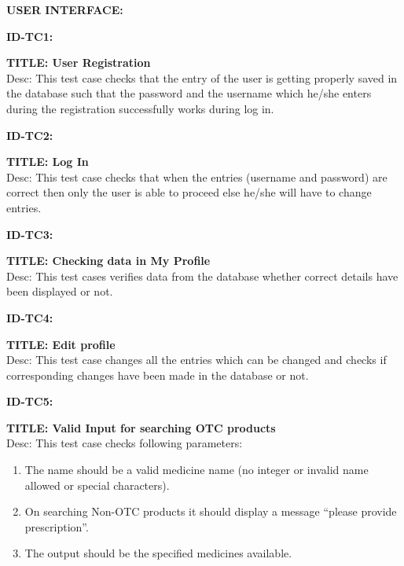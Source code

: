 \documentclass{article}
\begin{document}
\item \textbf{USER INTERFACE:}

\item \textbf{ID-TC1:}
\item \textbf{TITLE: User Registration}\\
Desc: This test case checks that the entry of the user is getting properly saved in the database such that the password and the username which he/she enters during the registration successfully works during log in.\\

\item \textbf{ID-TC2:}
\item \textbf{TITLE: Log In}\\
Desc: This test case checks that when the entries (username and password) are correct then only the user is able to proceed else he/she will have to change entries.\\

\item \textbf{ID-TC3:}
\item \textbf{TITLE: Checking data in My Profile}\\
Desc: This test cases verifies data from the database whether correct details have been displayed or not.\\

\item \textbf{ID-TC4:}
\item \textbf{TITLE: Edit profile}\\
Desc: This test case changes all the entries which can be changed and checks if corresponding changes have been made in the database or not.\\

\item \textbf{ID-TC5:}
\item \textbf{TITLE: Valid Input for searching OTC products}\\
Desc: This test case checks following parameters:
\begin{enumerate}
\item The name should be a valid medicine name (no integer or invalid name allowed or special characters).
\item On searching Non-OTC products it should display a message “please provide prescription”.
\item The output should be the specified medicines available.
\end{enumerate}
\end{document}
